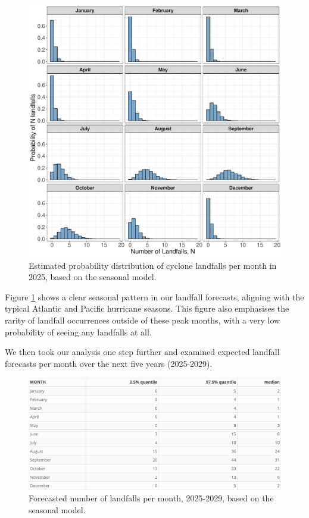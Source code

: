 \documentclass[
]{article}
\begin{document}
\begin{figure}

{\centering \includegraphics[width=0.82\linewidth]{../outputs/bayesian-analysis-monthly-freq/landfall-monthly-density-plots} 

}

\caption{Estimated probability distribution of cyclone landfalls per month in 2025, based on the seasonal model.}\label{fig:figs2}
\end{figure}

Figure \ref{fig:figs2} shows a clear seasonal pattern in our landfall forecasts, aligning with the typical Atlantic and Pacific hurricane seasons. This figure also emphasises the rarity of landfall occurrences outside of these peak months, with a very low probability of seeing any landfalls at all.

We then took our analysis one step further and examined expected landfall forecasts per month over the next five years (2025-2029).

\begin{figure}

{\centering \includegraphics[width=1\linewidth]{../outputs/bayesian-analysis-monthly-freq/simple-landfalls-monthly-forecasts} 

}

\caption{Forecasted number of landfalls per month, 2025-2029, based on the seasonal model.}\label{fig:figs3}
\end{figure}
\end{document}

